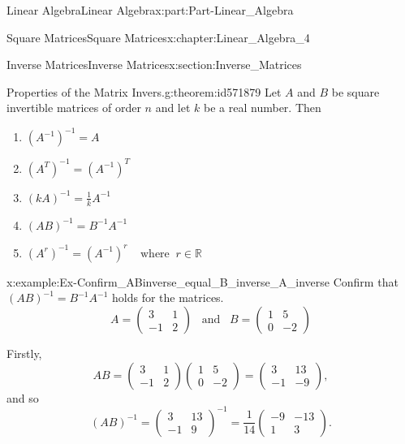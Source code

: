 \documentclass[oneside,10pt,]{book}
\numberwithin{equation}{section}
\newcommand{\amp}{&}
\begin{document}
\begin{partptx}{Linear Algebra}{}{Linear Algebra}{}{}{x:part:Part-Linear_Algebra}
\begin{chapterptx}{Square Matrices}{}{Square Matrices}{}{}{x:chapter:Linear_Algebra_4}
\begin{sectionptx}{Inverse Matrices}{}{Inverse Matrices}{}{}{x:section:Inverse_Matrices}
\begin{theorem}{Properties of the Matrix Invers.}{}{g:theorem:id571879}
Let \(A \) and \(B \) be square invertible matrices of order \(n \) and let \(k \) be a real number. Then %
\begin{enumerate}
\item{}\(\displaystyle (A^{-1})^{-1}=A \)%
\item{}\(\displaystyle (A^{T})^{-1}=(A^{-1})^{T} \)%
\item{}\(\displaystyle (kA)^{-1}=\frac{1}{k}A^{-1} \)%
\item{}\(\displaystyle (AB)^{-1}=B^{-1}A^{-1} \)%
\item{}\(\displaystyle (A^{r})^{-1}=(A^{-1})^{r}\;\;\;\; \text{where}\;\; r\in \mathbb{R} \)%
\end{enumerate}
%
\end{theorem}
\begin{example}{}{x:example:Ex-Confirm_ABinverse_equal_B_inverse_A_inverse}%
Confirm that \((AB)^{-1}=B^{-1}A^{-1} \) holds for the matrices.%
\begin{equation*}
A=\begin{pmatrix} 3 \amp 1 \\ -1 \amp 2 \end{pmatrix} \;\;\; \text{and}\;\;\; B=\begin{pmatrix} 1 \amp 5 \\ 0 \amp -2 \end{pmatrix}         
\end{equation*}
%
\par\smallskip%
\noindent\hypertarget{g:solution:id571959}{}Firstly,%
\begin{equation*}
AB=\begin{pmatrix} 3 \amp 1 \\ -1 \amp 2 \end{pmatrix} \begin{pmatrix} 1 \amp 5 \\ 0 \amp -2 \end{pmatrix} = \begin{pmatrix} 3 \amp 13 \\ -1 \amp -9 \end{pmatrix},
\end{equation*}
and so%
\begin{equation*}
(AB)^{-1}=\begin{pmatrix} 3 \amp 13 \\ -1 \amp 9 \end{pmatrix}^{-1} = \frac{1}{14}\begin{pmatrix} -9 \amp -13 \\ 1 \amp 3 \end{pmatrix}. 

\end{equation*}
\end{example}
\end{sectionptx}
\end{chapterptx}
\end{partptx}
\end{document}
